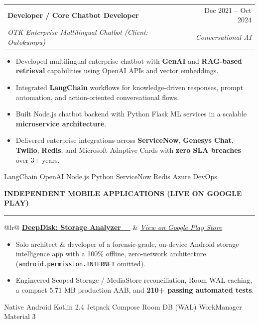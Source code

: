 \documentclass[10pt,a4paper]{article}
\newcommand{\sectiontitle}[1]{%
    \vspace{4pt}
    {\normalsize\textbf{\uppercase{\textcolor{primary}{#1}}}}
    \vspace{-3pt}
    \par\textcolor{primary}{\rule{\textwidth}{0.6pt}}
    \vspace{2pt}
}
\newcommand{\skilltag}[1]{%
    \colorbox{tagbg}{\scriptsize\textcolor{tagtxt}{\textsf{#1}}}\hspace{1.5pt}%
}
\begin{document}
\vspace{3pt}

\begin{tabular*}{\textwidth}{@{\extracolsep{\fill}}lr@{}}
{\small\textbf{Developer / Core Chatbot Developer}} & {\footnotesize\textcolor{subtitle}{Dec 2021 -- Oct 2024}} \\
{\footnotesize\textit{OTK Enterprise Multilingual Chatbot (Client: Outokumpu)}} & {\footnotesize\textit{\textcolor{subtitle}{Conversational AI}}}
\end{tabular*}
{\footnotesize
\begin{itemize}
    \item Developed multilingual enterprise chatbot with \textbf{GenAI} and \textbf{RAG-based retrieval} capabilities using OpenAI APIs and vector embeddings.
    \item Integrated \textbf{LangChain} workflows for knowledge-driven responses, prompt automation, and action-oriented conversational flows.
    \item Built Node.js chatbot backend with Python Flask ML services in a scalable \textbf{microservice architecture}.
    \item Delivered enterprise integrations across \textbf{ServiceNow}, \textbf{Genesys Chat}, \textbf{Twilio}, \textbf{Redis}, and Microsoft Adaptive Cards with \textbf{zero SLA breaches} over 3+ years.
\end{itemize}
}
\skilltag{LangChain} \skilltag{OpenAI} \skilltag{Node.js} \skilltag{Python} \skilltag{ServiceNow} \skilltag{Redis} \skilltag{Azure DevOps}

\sectiontitle{Independent Mobile Applications (Live on Google Play)}

\begin{tabular*}{\textwidth}{@{\extracolsep{\fill}}lr@{}}
\href{https://play.google.com/store/apps/details?id=com.cloudcubit.deepdisk&pcampaignid=web_share}{{\small\textbf{\textcolor{primary}{DeepDisk: Storage Analyzer}}} \ \faGooglePlay\ \faExternalLink}
& \href{https://play.google.com/store/apps/details?id=com.cloudcubit.deepdisk&pcampaignid=web_share}{\footnotesize\textit{\textcolor{subtitle}{View on Google Play Store}}}
\end{tabular*}
{\footnotesize
\begin{itemize}
    \item Solo architect \& developer of a forensic-grade, on-device Android storage intelligence app with a 100\% offline, zero-network architecture (\texttt{android.permission.INTERNET} omitted).
    \item Engineered Scoped Storage / MediaStore reconciliation, Room WAL caching, a compact 5.71 MB production AAB, and \textbf{210+ passing automated tests}.
\end{itemize}
}
\skilltag{Native Android} \skilltag{Kotlin 2.4} \skilltag{Jetpack Compose} \skilltag{Room DB (WAL)} \skilltag{WorkManager} \skilltag{Material 3}
\end{document}
